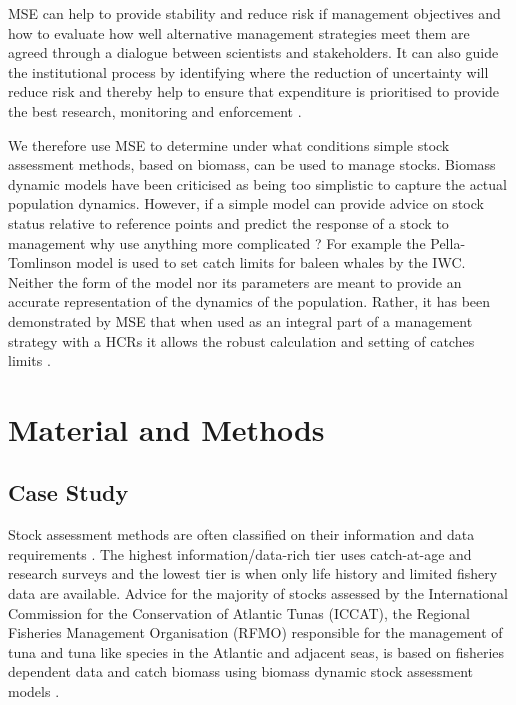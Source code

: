 \documentclass[%
nonumbib,      %
%
]{nrc1}                          %
\begin{document}
MSE can help to provide stability and reduce risk if management objectives and how to evaluate how well alternative management strategies meet them are agreed through a dialogue between scientists and stakeholders. It can also guide the institutional process by identifying where the reduction of uncertainty will reduce risk and thereby help to ensure that expenditure is prioritised to provide the best research, monitoring and enforcement \citep{fromentin2014spectre}.

We therefore use MSE to determine under what conditions simple stock assessment methods, based on biomass, can be used to manage stocks.  Biomass dynamic models have been criticised \cite[e.g.][]{maunder2003time} as being too simplistic to capture the actual population dynamics. However, if a simple model can provide advice on stock status relative to reference points and predict the response of a stock to management why use anything more complicated  \citep{ludwig1985age}?  For example the Pella-Tomlinson model is used to set catch limits for baleen whales by the IWC.  Neither the form of the model nor its parameters are meant to provide an accurate representation of the dynamics of the population. Rather, it has been demonstrated by MSE that when used as an integral part of a management strategy with a HCRs it allows the robust calculation and setting of catches limits \citep{butterworth1999experiences}. %

\section*{Material and Methods}

\subsection*{Case Study}

Stock assessment methods are often classified on their information and data requirements \cite[e.g.][]{smith2005harvest, smith2008experience}. The highest information/data-rich tier uses catch-at-age and research surveys and the lowest tier is when only life history and limited fishery data are available. Advice for the majority of stocks assessed by the International Commission for the Conservation of Atlantic Tunas (ICCAT), the Regional Fisheries Management Organisation (RFMO) responsible for the management of tuna and tuna like species in the Atlantic and adjacent seas, is based on fisheries dependent data and catch biomass using biomass dynamic stock assessment models \cite[e.g.][]{prager1994suite, mcallister2000application}. 
\end{document}
